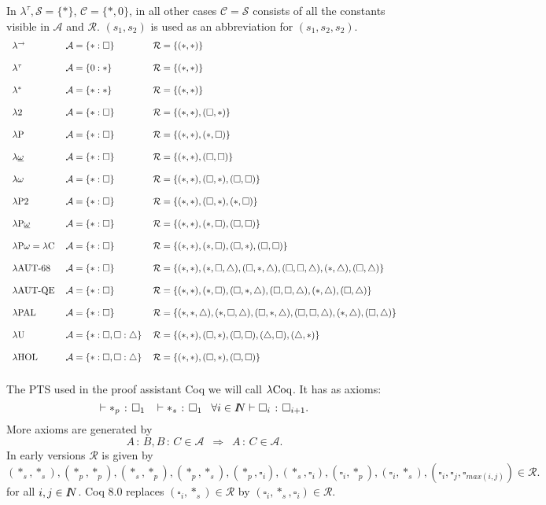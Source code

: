 \documentclass{LMCS}
\def\rbox#1{\mbox{\rm #1}}
\def\:{\mathbin{\,:\,}}
\def\RIghtarrow{\enspace\Rightarrow\enspace}
\def\ebox#1{\enspace\hbox{\!}\enspace}
\newcommand{\Na}{{I\kern-4pt N}}
\begin{document}
  In $\lambda^\tau ,\mathcal S=\{ *\}$, ${\mathcal C}=\{*,0\}$, in
  all other cases ${\mathcal C} =\mathcal S$ consists of all the
  constants visible in ${\mathcal A}$ and $\mathcal R$.  $(s_1, s_2)$
  is used as an abbreviation for $(s_1, s_2, s_2)$.
\bigskip
{\small\[\begin{tabular}{llllllllll}
$\lambda^{\rightarrow}$ & ${\mathcal A}=\{*:\square\}$&
$\mathcal R=\{(*,*)\}$\cr\cr
$\lambda^\tau$ & ${\mathcal A}=\{0:*\}$&
$\mathcal R=\{(*,*)\}$\cr\cr
$\lambda ^*$ & ${\mathcal A}=\{*:*\}$&
$\mathcal R=\{(*,*)\}$\cr\cr
$\lambda 2$ & ${\mathcal A}=\{*:\square\}$&
$\mathcal R=\{(*,*), (\square,*)\}$\cr\cr
$\lambda $P & ${\mathcal A}=\{*:\square\}$&
$\mathcal R =\{(*,*),(*,\square)\}$\cr\cr
$\lambda\underline{\omega}$ & ${\mathcal A}=\{*:\square\}$&
$\mathcal R=\{(*,*), (\square,\square)\}$\cr\cr
$\lambda\omega$ & ${\mathcal A}=\{*:\square\}$&
$\mathcal R=\{(*,*),(\square, *), (\square,\square)\}$\cr\cr
$\lambda $P2 & ${\mathcal A}=\{*:\square\}$&
$\mathcal R=\{(*,*),(\square, *), (*,\square)\}$\cr\cr
$\lambda $P$\underline{\omega}$ & ${\mathcal A}=\{*:\square\}$&
$\mathcal R=\{(*,*),(*,\square), (\square,\square)\}$\cr\cr
$\lambda $P$\omega=\lambda $C & ${\mathcal A}=\{*:\square\}$&
$\mathcal R=\{(*,*),(*,\square),(\square,*),(\square,\square)\}$\cr\cr
$\lambda$AUT-68 & ${\mathcal A}=\{*:\square\}$&
$\mathcal R=\{(*,*),(*,\square,\triangle),
(\square,*,\triangle),(\square,\square,\triangle),(*,\triangle),
(\square,\triangle)\} $\cr\cr
$\lambda$AUT-QE & ${\mathcal A}=\{*:\square\}$& $\mathcal
R=\{(*,*),(*,\square),
(\square,*,\triangle),(\square,\square,\triangle),(*,\triangle),
(\square,\triangle)\}$\cr\cr
$\lambda$PAL & ${\mathcal A}=\{*:\square\}$& $\mathcal
R=\{(*,*,\triangle),(*,\square,\triangle),
(\square,*,\triangle),(\square,\square,\triangle),(*,\triangle),
(\square,\triangle)\}$\cr\cr
$\lambda $U & ${\mathcal
A}=\{*:\square,\square:\triangle\}$& $\mathcal R=\{(*,*),(\square,*),
(\square,\square),(\triangle,\square),(\triangle,*)\}$\cr\cr
$\lambda $HOL & ${\mathcal A}=\{*:\square,\square:\triangle\}$& $\mathcal R=\{(*,*),(\square,*),(\square,\square)\}$\cr\cr
\end{tabular}
\]}
  The PTS used in the proof assistant Coq we will call $\lambda\rbox{Coq}$.
  It has as axioms:
\[\vdash *_p\:\square_1\ebox{,}\vdash *_s\:\square_1\ebox{,}\forall
  i\in\Na\vdash\square_i\:\square_{i+1}.
\]
  More axioms are generated by
\[A\:B, B\:C\in {\mathcal A}\RIghtarrow A\:C\in{\mathcal A}.\]
  In early versions ${\mathcal R}$ is given by
\[(*_s,*_s),(*_p,*_p),(*_s,*_p),(*_p,*_s),(*_p,\square_i),(*_s,\square_i),(\square_i,*_p),(\square_i,*_s),(\square_i,
\square_j,\square_{max(i,j)})\in\mathcal R.\] for all $i,j\in\Na$.
  Coq 8.0 replaces $(\square_i,*_s)\in {\mathcal R}$ by $(\square_i,
  *_s,\square_i)\in {\mathcal R}$.
\end{document}
